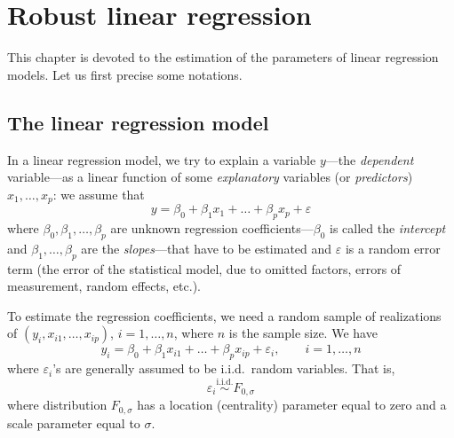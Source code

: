 \chapter{Robust linear regression}
\label{chap:robreg}

This chapter is devoted to the estimation of the parameters of linear
regression models. Let us first precise some notations.

\section{The linear regression model}

In a linear regression model, we try to explain a variable $y$---the
\emph{dependent} variable---as a linear function of some \emph{explanatory}
variables (or \emph{predictors}) $x_1, \dots, x_p$: we assume that
%
\begin{equation}
    \label{eq:linear_regr_model}
    y = \beta_0 + \beta_1x_1 + \dots + \beta_px_p + \varepsilon
\end{equation}
%
where $\beta_0, \beta_1, \dots, \beta_p$ are unknown regression
coefficients---$\beta_0$ is called the \emph{intercept} and $\beta_1,
\dots, \beta_p$ are the \emph{slopes}---that have to be estimated and
$\varepsilon$ is a random error term (the error of the statistical model, due
to omitted factors, errors of measurement, random effects, etc.).

To estimate the regression coefficients, we need a random sample of
realizations of $(y_i, x_{i1}, \ldots, x_{ip})$, $i=1, \dots, n$, where $n$
is the sample size. We have
%
\begin{equation}
    \label{eq:linear_regr_model_sample}
    y_i = \beta_0 + \beta_1x_{i1} + \dots + \beta_px_{ip} + \varepsilon_i,
    \qquad i = 1, \dots, n
\end{equation}
%
where $\varepsilon_i$'s are generally assumed to be i.i.d.\ random variables.
That is,
\[
    \varepsilon_i \stackrel{\text{i.i.d.}}{\sim} F_{0, \sigma}
\]
where distribution $F_{0, \sigma}$ has a location (centrality) parameter equal
to zero and a scale parameter equal to $\sigma$.


